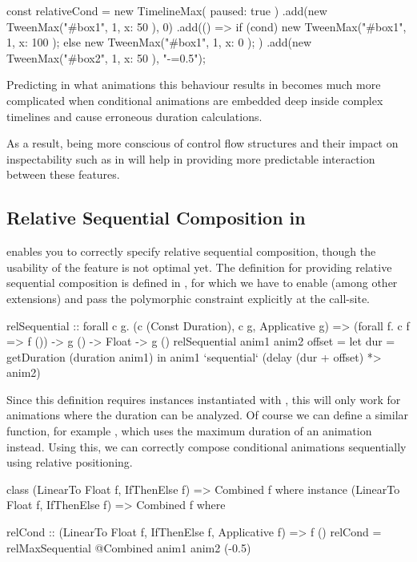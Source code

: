 \begin{js}
const relativeCond = new TimelineMax({ paused: true })
  .add(new TweenMax("#box1", 1, { x: 50 }), 0)
  .add(() => { if (cond) { new TweenMax("#box1", 1, { x: 100 });
               } else { new TweenMax("#box1", 1, { x: 0 }); } })
  .add(new TweenMax("#box2", 1, { x: 50 }), "-=0.5");
\end{js}

Predicting in what animations this behaviour results in becomes much more complicated when conditional animations are embedded deep inside complex timelines and cause erroneous duration calculations.

As a result, being more conscious of control flow structures and their impact on inspectability such as in \dsl{} will help in providing more predictable interaction between these features.

\subsection{Relative Sequential Composition in \dsl{}}

\dsl{} enables you to correctly specify relative sequential composition, though the usability of the feature is not optimal yet. The definition for providing relative sequential composition is defined in , for which we have to enable  (among other extensions) and pass the polymorphic constraint  explicitly at the call-site.

\begin{spec}
relSequential :: forall c g.
  (c (Const Duration), c g, Applicative g) =>
  (forall f. c f => f ()) -> g () -> Float -> g ()
relSequential anim1 anim2 offset = let
  dur = getDuration (duration anim1)
  in anim1 `sequential` (delay (dur + offset) *> anim2)
\end{spec}

Since this definition requires instances instantiated with , this will only work for animations where the duration can be analyzed. Of course we can define a similar function, for example , which uses the maximum duration of an animation instead. Using this, we can correctly compose conditional animations sequentially using relative positioning.

\begin{spec}[mathescape=true]
class (LinearTo Float f, IfThenElse f) => Combined f where
instance (LinearTo Float f, IfThenElse f) => Combined f where

relCond :: (LinearTo Float f, IfThenElse f, Applicative f) => f ()
relCond = relMaxSequential @Combined anim1 anim2 (-0.5)
\end{spec}

